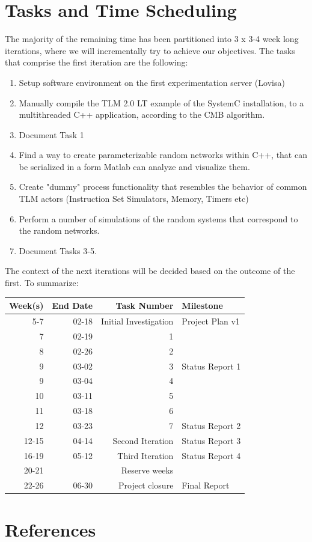 \documentclass[12pt,twoside]{article}
\begin{document}
\section{Tasks and Time Scheduling}
\label{sec:orgheadline20}
The majority of the remaining time has been partitioned into 3 x 3-4 week long iterations, 
where we will incrementally try to achieve our objectives.
The tasks that comprise the first iteration are the following:
\begin{enumerate}
\item Setup software environment on the first experimentation server (Lovisa)
\item Manually compile the TLM 2.0 LT example of the SystemC installation, to a multithreaded C++ application, according to the CMB algorithm.
\item Document Task 1
\item Find a way to create parameterizable random networks within C++, that can be serialized in a form Matlab can analyze and visualize them.
\item Create "dummy" process functionality that resembles the behavior of common TLM actors (Instruction Set Simulators, Memory, Timers etc)
\item Perform a number of simulations of the random systems that correspond to the random networks.
\item Document Tasks 3-5.
\end{enumerate}

The context of the next iterations will be decided based on the outcome of the first.
To summarize:

\begin{center}
\begin{tabular}{rrrl}
\textbf{Week(s)} & \textbf{End Date} & \textbf{Task Number} & \textbf{Milestone}\\
\hline
5-7 & 02-18 & Initial Investigation & Project Plan v1\\
\hline
7 & 02-19 & 1 & \\
\hline
8 & 02-26 & 2 & \\
\hline
9 & 03-02 & 3 & Status Report 1\\
\hline
9 & 03-04 & 4 & \\
\hline
10 & 03-11 & 5 & \\
\hline
11 & 03-18 & 6 & \\
\hline
12 & 03-23 & 7 & Status Report 2\\
\hline
12-15 & 04-14 & Second Iteration & Status Report 3\\
\hline
16-19 & 05-12 & Third  Iteration & Status Report 4\\
\hline
20-21 &  & Reserve weeks & \\
\hline
22-26 & 06-30 & Project closure & Final Report\\
\end{tabular}
\end{center}


\section{References}
\label{sec:orgheadline21}
\renewcommand\refname{}


\end{document}
